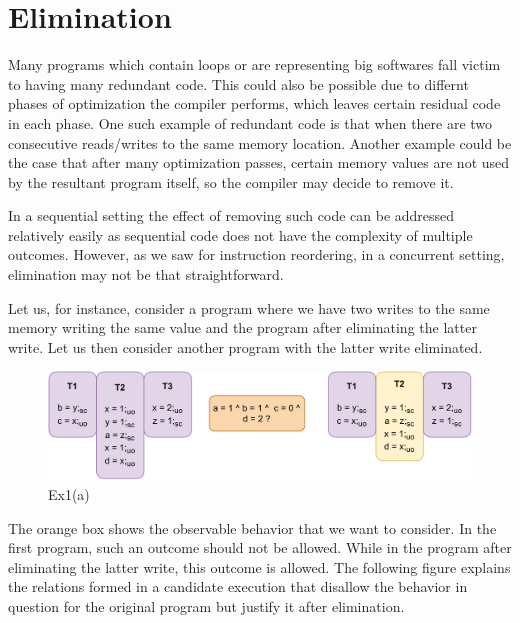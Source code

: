 \section{Elimination}

    Many programs which contain loops or are representing big softwares fall victim to having many redundant code. 
    This could also be possible due to differnt phases of optimization the compiler performs, which leaves certain residual code in each phase.
    One such example of redundant code is that when there are two consecutive reads/writes to the same memory location.
    Another example could be the case that after many optimization passes, certain memory values are not used by the resultant program itself, so the compiler may decide to remove it.
    

    In a sequential setting the effect of removing such code can be addressed relatively easily as sequential code does not have the complexity of multiple outcomes.
    However, as we saw for instruction reordering, in a concurrent setting, elimination may not be that straightforward. 
    
    Let us, for instance, consider a program where we have two writes to the same memory writing the same value and the program after eliminating the latter write. Let us then consider another program with the latter write eliminated.  

    \begin{figure}[H]
        \centering
        \includegraphics[scale=0.7]{Elimination/EliminationExample1(a).pdf}
        \caption{Ex1(a)} 
    \end{figure}

    The orange box shows the observable behavior that we want to consider. 
    In the first program, such an outcome should not be allowed. 
    While in the program after eliminating the latter write, this outcome is allowed.
    The following figure explains the relations formed in a candidate execution that disallow the behavior in question for the original program but justify it after elimination. 
    
